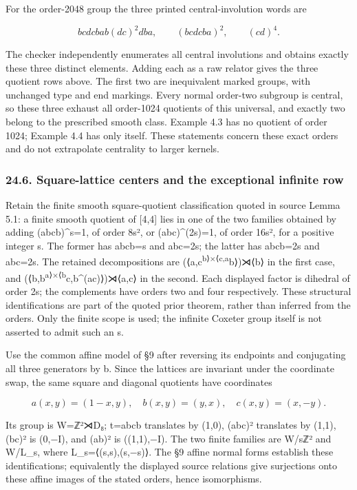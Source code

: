 \documentclass[
  10pt,
  letterpaper,
]{article}
\begin{document}
For the order-2048 group the three printed central-involution words are

\[
bcdcbab(dc)^2dba,\qquad(bcdcba)^2,\qquad(cd)^4.
\tag{N4}
\]

The checker independently enumerates all central involutions and obtains
exactly these three distinct elements. Adding each as a raw relator
gives the three quotient rows above. The first two are inequivalent
marked groups, with unchanged type and end markings. Every normal
order-two subgroup is central, so these three exhaust all order-1024
quotients of this universal, and exactly two belong to the prescribed
smooth class. Example 4.3 has no quotient of order 1024; Example 4.4 has
only itself. These statements concern these exact orders and do not
extrapolate centrality to larger kernels.

\subsubsection{24.6. Square-lattice centers and the exceptional infinite
row}\label{square-lattice-centers-and-the-exceptional-infinite-row}

Retain the finite smooth square-quotient classification quoted in source
Lemma 5.1: a finite smooth quotient of {[}4,4{]} lies in one of the two
families obtained by adding (abcb)\^{}s=1, of order 8s², or
(abc)\^{}(2s)=1, of order 16s², for a positive integer s. The former has
\textbar abcb\textbar=s and \textbar abc\textbar=2s; the latter has
\textbar abcb\textbar=2s and \textbar abc\textbar=2s. The retained
decompositions are (⟨a,c\textsuperscript{b⟩×⟨c,a}b⟩)⋊⟨b⟩ in the first
case, and (⟨b,b\textsuperscript{a⟩×⟨b}c,b\^{}(ac)⟩)⋊⟨a,c⟩ in the second.
Each displayed factor is dihedral of order 2s; the complements have
orders two and four respectively. These structural identifications are
part of the quoted prior theorem, rather than inferred from the orders.
Only the finite scope is used; the infinite Coxeter group itself is not
asserted to admit such an s.

Use the common affine model of §9 after reversing its endpoints and
conjugating all three generators by b. Since the lattices are invariant
under the coordinate swap, the same square and diagonal quotients have
coordinates

\[
a(x,y)=(1-x,y),\quad b(x,y)=(y,x),\quad c(x,y)=(x,-y).
\tag{N5}
\]

Its group is W=ℤ²⋊D₈; t=abcb translates by (1,0), (abc)² translates by
(1,1), (bc)² is (0,−I), and (ab)² is ((1,1),−I). The two finite families
are W/sℤ² and W/L\_s, where L\_s=⟨(s,s),(s,−s)⟩. The §9 affine normal
forms establish these identifications; equivalently the displayed source
relations give surjections onto these affine images of the stated
orders, hence isomorphisms.
\end{document}
